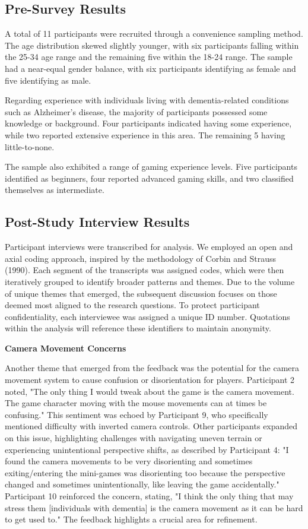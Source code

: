 \documentclass{l4proj}
\begin{document}
\subsection{Pre-Survey Results}
A total of 11 participants were recruited through a convenience sampling method.  The age distribution skewed slightly younger, with six participants falling within the 25-34 age range and the remaining five within the 18-24 range.  The sample had a near-equal gender balance, with six participants identifying as female and five identifying as male.

Regarding experience with individuals living with dementia-related conditions such as Alzheimer's disease, the majority of participants possessed some knowledge or background. Four participants indicated having some experience, while two reported extensive experience in this area. The remaining 5 having little-to-none.

The sample also exhibited a range of gaming experience levels. Five participants identified as beginners, four reported advanced gaming skills, and two classified themselves as intermediate.

\subsection{Post-Study Interview Results}
Participant interviews were transcribed for analysis. We employed an open and axial coding approach, inspired by the methodology of Corbin and Strauss (1990).  Each segment of the transcripts was assigned codes, which were then iteratively grouped to identify broader patterns and themes. Due to the volume of unique themes that emerged, the subsequent discussion focuses on those deemed most aligned to the research questions. To protect participant confidentiality, each interviewee was assigned a unique ID number. Quotations within the analysis will reference these identifiers to maintain anonymity.
\newline

\textbf{Camera Movement Concerns}

Another theme that emerged from the feedback was the potential for the camera movement system to cause confusion or disorientation for players. Participant 2 noted, "The only thing I would tweak about the game is the camera movement. The game character moving with the mouse movements can at times be confusing." This sentiment was echoed by Participant 9, who specifically mentioned difficulty with inverted camera controls. Other participants expanded on this issue, highlighting challenges with navigating uneven terrain or experiencing unintentional perspective shifts, as described by Participant 4:  "I found the camera movements to be very disorienting and sometimes exiting/entering the mini-games was disorienting too because the perspective changed and sometimes unintentionally, like leaving the game accidentally." Participant 10 reinforced the concern, stating, "I think the only thing that may stress them [individuals with dementia] is the camera movement as it can be hard to get used to." The feedback highlights a crucial area for refinement. 
\end{document}

